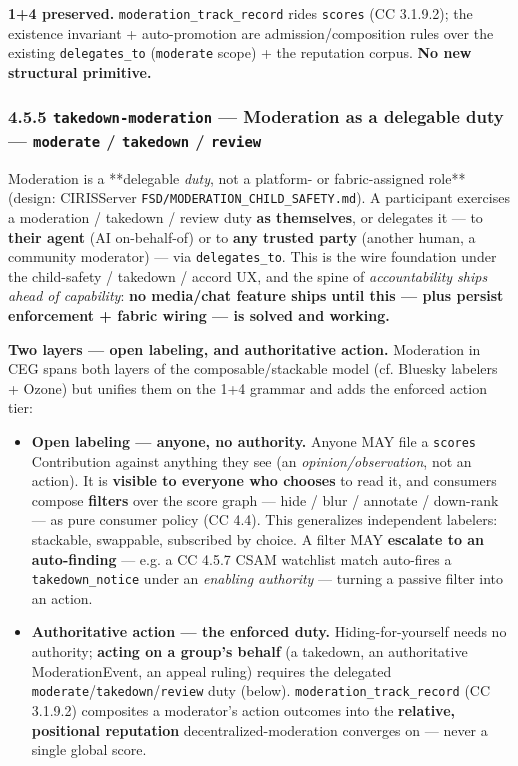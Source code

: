 \documentclass[11pt]{article}
\begin{document}
\textbf{1+4 preserved.} \texttt{moderation\_track\_record} rides \texttt{scores} (CC 3.1.9.2); the existence invariant + auto-promotion are admission/composition rules over the existing \texttt{delegates\_to} (\texttt{moderate} scope) + the reputation corpus. \textbf{No new structural primitive.}


\subsubsection*{4.5.5 \texttt{takedown-moderation} — Moderation as a delegable duty — \texttt{moderate} / \texttt{takedown} / \texttt{review}}


Moderation is a **delegable \textit{duty}, not a platform- or fabric-assigned role** (design: CIRISServer \texttt{FSD/MODERATION\_CHILD\_SAFETY.md}). A participant exercises a moderation / takedown / review duty \textbf{as themselves}, or delegates it — to \textbf{their agent} (AI on-behalf-of) or to \textbf{any trusted party} (another human, a community moderator) — via \texttt{delegates\_to}. This is the wire foundation under the child-safety / takedown / accord UX, and the spine of \textit{accountability ships ahead of capability}: \textbf{no media/chat feature ships until this — plus persist enforcement + fabric wiring — is solved and working.}


\textbf{Two layers — open labeling, and authoritative action.} Moderation in CEG spans both layers of the composable/stackable model (cf. Bluesky labelers + Ozone) but unifies them on the 1+4 grammar and adds the enforced action tier:


\begin{itemize}\setlength\itemsep{0pt}
\item \textbf{Open labeling — anyone, no authority.} Anyone MAY file a \texttt{scores} Contribution against anything they see (an \textit{opinion/observation}, not an action). It is \textbf{visible to everyone who chooses} to read it, and consumers compose \textbf{filters} over the score graph — hide / blur / annotate / down-rank — as pure consumer policy (CC 4.4). This generalizes independent labelers: stackable, swappable, subscribed by choice. A filter MAY \textbf{escalate to an auto-finding} — e.g. a CC 4.5.7 CSAM watchlist match auto-fires a \texttt{takedown\_notice} under an \textit{enabling authority} — turning a passive filter into an action.
\item \textbf{Authoritative action — the enforced duty.} Hiding-for-yourself needs no authority; \textbf{acting on a group's behalf} (a takedown, an authoritative ModerationEvent, an appeal ruling) requires the delegated \texttt{moderate}/\texttt{takedown}/\texttt{review} duty (below). \texttt{moderation\_track\_record} (CC 3.1.9.2) composites a moderator's action outcomes into the \textbf{relative, positional reputation} decentralized-moderation converges on — never a single global score.
\end{itemize}
\end{document}

